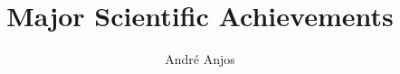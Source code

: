 \documentclass[a4paper,10pt,onecolumn]{article}
\date{}
\begin{document}
\title{Major Scientific Achievements}
\author{André Anjos}
\maketitle

\section{}

\section{}

\section{}
\end{document}
